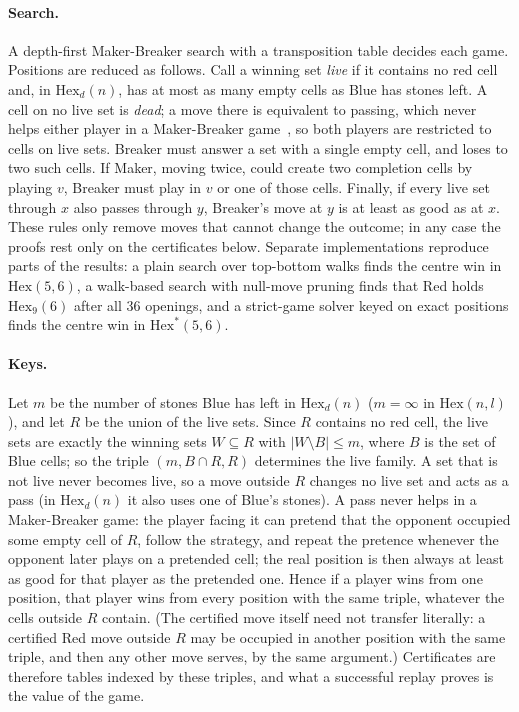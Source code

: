 \documentclass[11pt]{amsart}
\theoremstyle{definition}
\theoremstyle{remark}
\newcommand{\Hex}{\mathrm{Hex}}
\begin{document}
\paragraph{Search.} A depth-first Maker-Breaker search with a transposition table decides each game. Positions are reduced as follows. Call a winning set \emph{live} if it contains no red cell and, in $\Hex_d(n)$, has at most as many empty cells as Blue has stones left. A cell on no live set is \emph{dead}; a move there is equivalent to passing, which never helps either player in a Maker-Breaker game~\cite{Beck2008}, so both players are restricted to cells on live sets. Breaker must answer a set with a single empty cell, and loses to two such cells. If Maker, moving twice, could create two completion cells by playing $v$, Breaker must play in $v$ or one of those cells. Finally, if every live set through $x$ also passes through $y$, Breaker's move at $y$ is at least as good as at $x$. These rules only remove moves that cannot change the outcome; in any case the proofs rest only on the certificates below. Separate implementations reproduce parts of the results: a plain search over top-bottom walks finds the centre win in $\Hex(5,6)$, a walk-based search with null-move pruning finds that Red holds $\Hex_9(6)$ after all $36$ openings, and a strict-game solver keyed on exact positions finds the centre win in $\Hex^{*}(5,6)$.

\paragraph{Keys.} Let $m$ be the number of stones Blue has left in $\Hex_d(n)$ ($m=\infty$ in $\Hex(n,l)$), and let $R$ be the union of the live sets. Since $R$ contains no red cell, the live sets are exactly the winning sets $W\subseteq R$ with $|W\setminus B|\le m$, where $B$ is the set of Blue cells; so the triple $(m,B\cap R,R)$ determines the live family. A set that is not live never becomes live, so a move outside $R$ changes no live set and acts as a pass (in $\Hex_d(n)$ it also uses one of Blue's stones). A pass never helps in a Maker-Breaker game: the player facing it can pretend that the opponent occupied some empty cell of $R$, follow the strategy, and repeat the pretence whenever the opponent later plays on a pretended cell; the real position is then always at least as good for that player as the pretended one. Hence if a player wins from one position, that player wins from every position with the same triple, whatever the cells outside $R$ contain. (The certified move itself need not transfer literally: a certified Red move outside $R$ may be occupied in another position with the same triple, and then any other move serves, by the same argument.) Certificates are therefore tables indexed by these triples, and what a successful replay proves is the value of the game.
\end{document}

